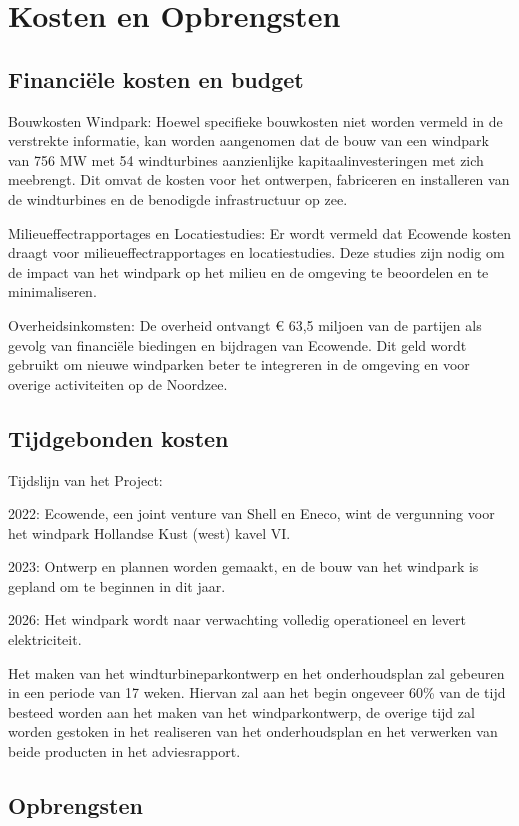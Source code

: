 \section{Kosten en Opbrengsten}
    \subsection{Financiële kosten en budget}
    Bouwkosten Windpark: Hoewel specifieke bouwkosten niet worden vermeld in de verstrekte informatie, kan worden aangenomen dat de bouw van een windpark van 756 MW met 54 windturbines aanzienlijke kapitaalinvesteringen met zich meebrengt. Dit omvat de kosten voor het ontwerpen, fabriceren en installeren van de windturbines en de benodigde infrastructuur op zee.

    Milieueffectrapportages en Locatiestudies: Er wordt vermeld dat Ecowende kosten draagt voor milieueffectrapportages en locatiestudies. Deze studies zijn nodig om de impact van het windpark op het milieu en de omgeving te beoordelen en te minimaliseren.

    Overheidsinkomsten: De overheid ontvangt € 63,5 miljoen van de partijen als gevolg van financiële biedingen en bijdragen van Ecowende. Dit geld wordt gebruikt om nieuwe windparken beter te integreren in de omgeving en voor overige activiteiten op de Noordzee.

    \subsection{Tijdgebonden kosten}
Tijdslijn van het Project:

    2022: Ecowende, een \gls{joint venture} van Shell en Eneco, wint de vergunning voor het windpark Hollandse Kust (west) kavel VI.

    2023: Ontwerp en plannen worden gemaakt, en de bouw van het windpark is gepland om te beginnen in dit jaar.

    2026: Het windpark wordt naar verwachting volledig operationeel en levert elektriciteit.

Het maken van het windturbineparkontwerp en het onderhoudsplan zal gebeuren in een periode van 17 weken. Hiervan zal aan het begin ongeveer 60\% van de tijd besteed worden aan het maken van het windparkontwerp, de overige tijd zal worden gestoken in het realiseren van het onderhoudsplan en het verwerken van beide producten in het adviesrapport.\cite{studiewijzer} 

\subsection{Opbrengsten}

